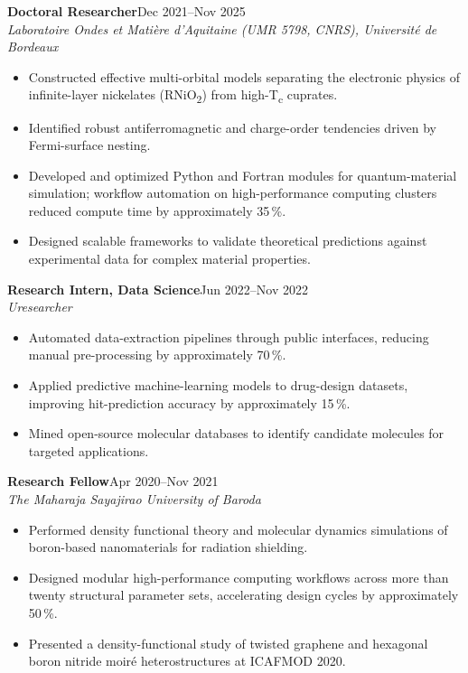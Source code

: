 \documentclass[10pt,a4paper]{article}
\newcommand{\entry}[3]{%
  \textbf{#1}\hfill{\ttfamily\footnotesize\color{dim}#3}\\
  {\itshape\color{dim}#2}\vspace{2pt}}
\begin{document}
\entry{Doctoral Researcher}
      {Laboratoire Ondes et Matière d'Aquitaine (UMR 5798, CNRS), Université de Bordeaux}
      {Dec 2021–Nov 2025}
\begin{itemize}
  \item Constructed effective multi-orbital models separating the electronic physics of
        infinite-layer nickelates (RNiO\textsubscript{2}) from high-T\textsubscript{c} cuprates.
  \item Identified robust antiferromagnetic and charge-order tendencies driven by
        Fermi-surface nesting.
  \item Developed and optimized Python and Fortran modules for quantum-material simulation;
        workflow automation on high-performance computing clusters reduced compute time by
        approximately 35\,\%.
  \item Designed scalable frameworks to validate theoretical predictions against
        experimental data for complex material properties.
\end{itemize}

\entry{Research Intern, Data Science}
      {Uresearcher}
      {Jun 2022–Nov 2022}
\begin{itemize}
  \item Automated data-extraction pipelines through public interfaces, reducing manual
        pre-processing by approximately 70\,\%.
  \item Applied predictive machine-learning models to drug-design datasets, improving
        hit-prediction accuracy by approximately 15\,\%.
  \item Mined open-source molecular databases to identify candidate molecules for
        targeted applications.
\end{itemize}

\entry{Research Fellow}
      {The Maharaja Sayajirao University of Baroda}
      {Apr 2020–Nov 2021}
\begin{itemize}
  \item Performed density functional theory and molecular dynamics simulations of
        boron-based nanomaterials for radiation shielding.
  \item Designed modular high-performance computing workflows across more than twenty
        structural parameter sets, accelerating design cycles by approximately 50\,\%.
  \item Presented a density-functional study of twisted graphene and hexagonal boron
        nitride moiré heterostructures at ICAFMOD 2020.
\end{itemize}
\end{document}
